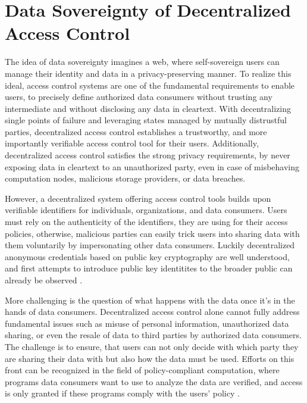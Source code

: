 \documentclass[conference]{IEEEtran}
\begin{document}
\section{Data Sovereignty of Decentralized Access Control}
The idea of data sovereignty imagines a web, where self-sovereign users can manage their identity and data in a privacy-preserving manner.
To realize this ideal, access control systems are one of the fundamental requirements to enable users, to precisely define authorized data consumers without trusting any intermediate and without disclosing any data in cleartext.
With decentralizing single points of failure and leveraging states managed by mutually distrustful parties, decentralized access control establishes a trustworthy, and more importantly verifiable access control tool for their users.
Additionally, decentralized access control satisfies the strong privacy requirements, by never exposing data in cleartext to an unauthorized party, even in case of misbehaving computation nodes, malicious storage providers, or data breaches.

However, a decentralized system offering access control tools builds upon verifiable identifiers for individuals, organizations, and data consumers.
Users must rely on the authenticity of the identifiers, they are using for their access policies, otherwise, malicious parties can easily trick users into sharing data with them voluntarily by impersonating other data consumers.
Luckily decentralized anonymous credentials based on public key cryptography are well understood, and first attempts to introduce public key identitites to the broader public can already be observed \cite{noauthor_keybase_nodate}.

More challenging is the question of what happens with the data once it's in the hands of data consumers.
Decentralized access control alone cannot fully address fundamental issues such as misuse of personal information, unauthorized data sharing, or even the resale of data to third parties by authorized data consumers.
The challenge is to ensure, that users can not only decide with which party they are sharing their data with but also how the data must be used.
Efforts on this front can be recognized in the field of policy-compliant computation, where programs data consumers want to use to analyze the data are verified, and access is only granted if these programs comply with the users' policy \cite{ernstberger_sok_2023}.
\end{document}
